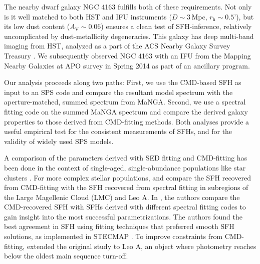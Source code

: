 \documentclass[preprint2]{aastex62}
\newcommand{\Av}{\ensuremath{A_{\mathrm{V}}}\xspace}
\begin{document}
The nearby dwarf galaxy NGC 4163 fulfills both of these requirements. Not only is it well matched to both HST and IFU instruments ($D \sim 3$\,Mpc, $r_{\mathrm{h}} \sim 0.5$'), but its low dust content ($\Av \sim 0.06$) ensures a clean test of SFH-inference, relatively uncomplicated by dust-metallicity degeneracies. This galaxy has deep multi-band imaging from HST, analyzed as a part of the ACS Nearby Galaxy Survey Treasury \citep[ANGST;][]{Dalcanton+2009, Dalcanton+2012}. We subsequently observed NGC 4163 with an IFU from the Mapping Nearby Galaxies at APO \citep[MaNGA;][]{Bundy+2015} survey in Spring 2014 as part of an ancillary program.

Our analysis proceeds along two paths: First, we use the CMD-based SFH as input to an SPS code and compare the resultant model spectrum with the aperture-matched, summed spectrum from MaNGA. Second, we use a spectral fitting code on the summed MaNGA spectrum and compare the derived galaxy properties to those derived from CMD-fitting methods. Both analyses provide a useful empirical test for the consistent measurements of SFHs, and for the validity of widely used SPS models. 

A comparison of the parameters derived with SED fitting and CMD-fitting has been done in the context of single-aged, single-abundance populations like star clusters \citep[e.g., ][]{Gibson+1999, Beasley+2002, Delgado+2010, Thomas+2011, Barber+2014, Kuncarayakti+2016, Usher+2017}. For more complex stellar populations, \citet{Ruiz-Lara+2015} and \citet{Ruiz-Lara+2018} compare the SFH recovered from CMD-fitting with the SFH recovered from spectral fitting in subregions of the Large Magellenic Cloud (LMC) and Leo A. In \citet{Ruiz-Lara+2015}, the authors compare the CMD-recovered SFH with SFHs derived with different spectral fitting codes to gain insight into the most successful parametrizations. The authors found the best agreement in SFH using fitting techniques that preferred smooth SFH solutions, as implemented in STECMAP \citep{Ocvirk+2006}. To improve constraints from CMD-fitting, \citet{Ruiz-Lara+2018} extended the original study to Leo A, an object where photometry reaches below the oldest main sequence turn-off.
\end{document}
